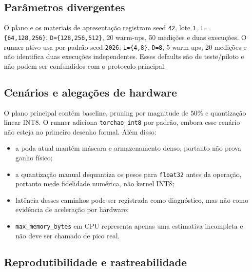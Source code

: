 \subsection{Parâmetros divergentes}







O plano e os materiais de apresentação registram seed \texttt{42}, lote \texttt{1}, \texttt{L=\{64,128,256\}}, \texttt{D=\{128,256,512\}}, 20 warm-ups, 50 medições e duas execuções. O runner ativo usa por padrão seed \texttt{2026}, \texttt{L=\{4,8\}}, \texttt{D=8}, 5 warm-ups, 20 medições e não identifica duas execuções independentes. Esses defaults são de teste/piloto e não podem ser confundidos com o protocolo principal.



\subsection{Cenários e alegações de hardware}





O plano principal contém baseline, pruning por magnitude de 50\% e quantização linear INT8. O runner adiciona \texttt{torchao\_\allowbreak{}int8} por padrão, embora esse cenário não esteja no primeiro desenho formal. Além disso:


\begin{itemize}
\item a poda atual mantém máscara e armazenamento denso, portanto não prova ganho
físico;
\item a quantização manual dequantiza os pesos para \texttt{float32} antes da operação,
portanto mede fidelidade numérica, não kernel INT8;
\item latência desses caminhos pode ser registrada como diagnóstico, mas não como
evidência de aceleração por hardware;
\item \texttt{max\_\allowbreak{}memory\_\allowbreak{}bytes} em CPU representa apenas uma estimativa incompleta e não
deve ser chamado de pico real.
\end{itemize}


\subsection{Reprodutibilidade e rastreabilidade}


